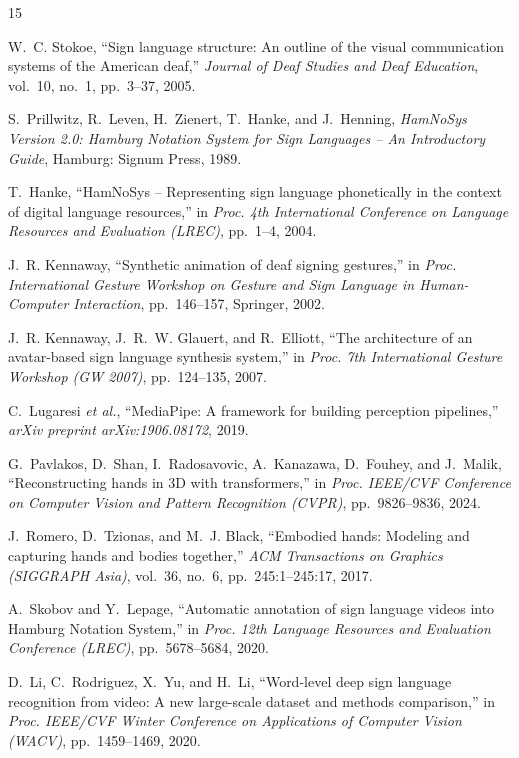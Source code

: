 \documentclass[11pt, a4paper]{article}
\begin{document}
\vspace{0.2cm}
\begin{thebibliography}{15}

W.~C. Stokoe, ``Sign language structure: An outline of the visual communication systems of the American deaf,'' \textit{Journal of Deaf Studies and Deaf Education}, vol.~10, no.~1, pp.~3--37, 2005.

S.~Prillwitz, R.~Leven, H.~Zienert, T.~Hanke, and J.~Henning, \textit{HamNoSys Version 2.0: Hamburg Notation System for Sign Languages -- An Introductory Guide}, Hamburg: Signum Press, 1989.

T.~Hanke, ``HamNoSys -- Representing sign language phonetically in the context of digital language resources,'' in \textit{Proc. 4th International Conference on Language Resources and Evaluation (LREC)}, pp.~1--4, 2004.

J.~R. Kennaway, ``Synthetic animation of deaf signing gestures,'' in \textit{Proc. International Gesture Workshop on Gesture and Sign Language in Human-Computer Interaction}, pp.~146--157, Springer, 2002.

J.~R. Kennaway, J.~R.~W. Glauert, and R.~Elliott, ``The architecture of an avatar-based sign language synthesis system,'' in \textit{Proc. 7th International Gesture Workshop (GW 2007)}, pp.~124--135, 2007.

C.~Lugaresi \textit{et al.}, ``MediaPipe: A framework for building perception pipelines,'' \textit{arXiv preprint arXiv:1906.08172}, 2019.

G.~Pavlakos, D.~Shan, I.~Radosavovic, A.~Kanazawa, D.~Fouhey, and J.~Malik, ``Reconstructing hands in 3D with transformers,'' in \textit{Proc. IEEE/CVF Conference on Computer Vision and Pattern Recognition (CVPR)}, pp.~9826--9836, 2024.

J.~Romero, D.~Tzionas, and M.~J. Black, ``Embodied hands: Modeling and capturing hands and bodies together,'' \textit{ACM Transactions on Graphics (SIGGRAPH Asia)}, vol.~36, no.~6, pp.~245:1--245:17, 2017.

A.~Skobov and Y.~Lepage, ``Automatic annotation of sign language videos into Hamburg Notation System,'' in \textit{Proc. 12th Language Resources and Evaluation Conference (LREC)}, pp.~5678--5684, 2020.

D.~Li, C.~Rodriguez, X.~Yu, and H.~Li, ``Word-level deep sign language recognition from video: A new large-scale dataset and methods comparison,'' in \textit{Proc. IEEE/CVF Winter Conference on Applications of Computer Vision (WACV)}, pp.~1459--1469, 2020.


\end{thebibliography}
\end{document}
